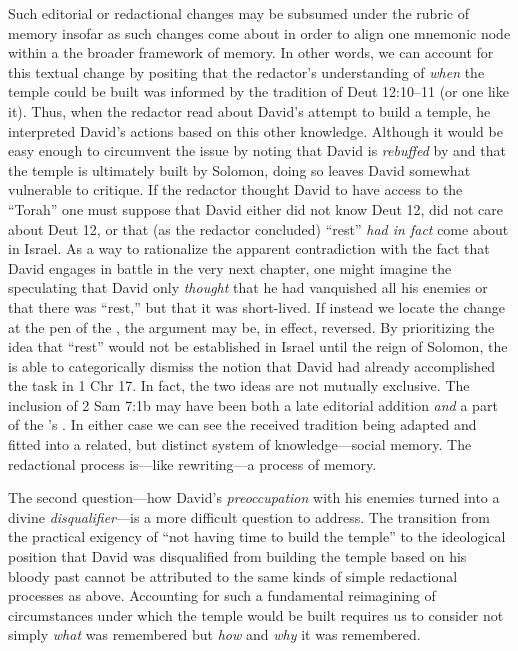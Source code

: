 Such editorial or redactional changes may be subsumed under the rubric of memory insofar as such changes come about in order to align one mnemonic node within a the broader framework of memory. In other words, we can account for this textual change by positing that the redactor's understanding of \emph{when} the temple could be built was informed by the tradition of Deut 12:10--11 (or one like it). Thus, when the redactor read about David's attempt to build a temple, he interpreted David's actions based on this other knowledge. Although it would be easy enough to circumvent the issue by noting that David is \emph{rebuffed} by \yahweh and that the temple is ultimately built by Solomon, doing so leaves David somewhat vulnerable to critique. If the redactor thought David to have access to the ``Torah'' one must suppose that David either did not know Deut 12, did not care about Deut 12, or that (as the redactor concluded) ``rest'' \emph{had in fact} come about in Israel. As a way to rationalize the apparent contradiction with the fact that David engages in battle in the very next chapter, one might imagine the \chronicler speculating that David only \emph{thought} that he had vanquished all his enemies or that there was ``rest,'' but that it was short-lived. If instead we locate the change at the pen of the \chronicler, the argument may be, in effect, reversed. By prioritizing the idea that ``rest'' would not be established in Israel until the reign of Solomon, the \chronicler is able to categorically dismiss the notion that David had already accomplished the task in 1 Chr 17. In fact, the two ideas are not mutually exclusive. The inclusion of 2 Sam 7:1b may have been both a late editorial addition \emph{and} a part of the \chronicler's \vorlage. In either case we can see the received tradition being adapted and fitted into a related, but distinct system of knowledge---social memory. The redactional process is---like rewriting---a process of memory.

The second question---how David's \emph{preoccupation} with his enemies turned into a divine \emph{disqualifier}---is a more difficult question to address. The transition from the practical exigency of ``not having time to build the temple'' to the ideological position that David was disqualified from building the temple based on his bloody past cannot be attributed to the same kinds of simple redactional processes as above. Accounting for such a fundamental reimagining of circumstances under which the temple would be built requires us to consider not simply \emph{what} was remembered but \emph{how} and \emph{why} it was remembered. 

